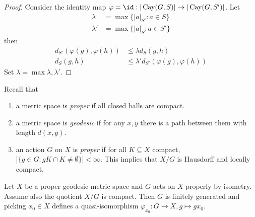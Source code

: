\documentclass[a4paper]{article}
\DeclareMathOperator{\Cay}{Cay} %
\begin{document}
\begin{proof}
  Consider the identity map \(\varphi = \id: |\Cay(G, S)| \to |\Cay(G, S')|\). Let
  \begin{align*}
    \lambda &= \max \{|a|_{S'}: a \in S\} \\
    \lambda' &= \max \{|a|_{S}: a \in S'\}
  \end{align*}
  then
  \begin{align*}
    d_{S'}(\varphi(g), \varphi(h)) &\leq \lambda d_S(g, h) \\
    d_S(g, h) &\leq \lambda' d_{S'}(\varphi(g), \varphi(h))
  \end{align*}
  Set \(\lambda = \max{\lambda, \lambda'}\).
\end{proof}

Recall that
\begin{enumerate}
\item a metric space is \emph{proper} if all closed balls are compact.
\item a metric space is \emph{geodesic} if for any \(x, y\) there is a path between them with length \(d(x, y)\).
\item an action \(G\) on \(X\) is \emph{proper} if for all \(K \subseteq X\) compact, \(|\{g \in G: gK \cap K \ne \emptyset\}| < \infty\). This implies that \(X/G\) is Hausdorff and locally compact.
\end{enumerate}

\begin{theorem}
  Let \(X\) be a proper geodesic metric space and \(G\) acts on \(X\) properly by isometry. Assume also the quotient \(X/G\) is compact. Then \(G\) is finitely generated and picking \(x_0 \in X\) defines a quasi-isomorphism \(\varphi_{x_0}: G \to X, g \mapsto g x_0\).
\end{theorem}
\end{document}
